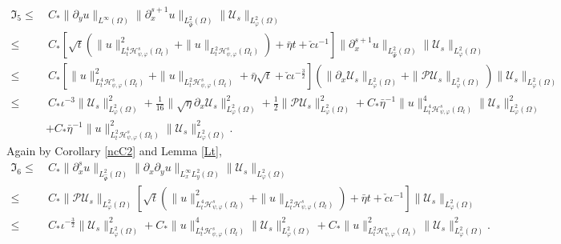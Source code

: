 \documentclass{amsart}
\numberwithin{equation}{section}
\begin{document}
\begin{align*}
\mathfrak{I}_{5}
\leq&~C_{*}\|\partial_{y}u\|_{L^{\infty}(\Omega)}\|\partial_{x}^{s+1}u\|_{L_{\hat{\Psi}}^{2}(\Omega)}\|\mathcal{U}_{s}\|_{L_{\varphi}^{2}(\Omega)}\\
\leq&~C_{*}\left[\sqrt{t}\left(\|u\|_{L_{t}^{4}\mathcal{H}_{\psi,\varphi}^{s}(\Omega_{t})}^{2}+\|u\|_{L_{t}^{2}\mathcal{H}_{\psi,\varphi}^{s}(\Omega_{t})}\right)
                 +\bar{\eta}t+\check{c}\iota^{-1}\right]
           \|\partial_{x}^{s+1}u\|_{L_{\hat{\Psi}}^{2}(\Omega)}
           \|\mathcal{U}_{s}\|_{L_{\varphi}^{2}(\Omega)}\\
\leq&~C_{*}\left[\|u\|_{L_{t}^{4}\mathcal{H}_{\psi,\varphi}^{s}(\Omega_{t})}^{2}+\|u\|_{L_{t}^{2}\mathcal{H}_{\psi,\varphi}^{s}(\Omega_{t})}
                 +\bar{\eta}\sqrt{t}+\check{c}\iota^{-\frac{3}{2}}\right]
          \left(\|\partial_{x}\mathcal{U}_{s}\|_{L_{\varphi}^{2}(\Omega)}+\|\mathcal{P}\mathcal{U}_{s}\|_{L_{\varphi}^{2}(\Omega)}\right)
           \|\mathcal{U}_{s}\|_{L_{\varphi}^{2}(\Omega)}\\
\leq&~C_{*}\iota^{-3}\|\mathcal{U}_{s}\|_{L_{\varphi}^{2}(\Omega)}^{2}
     +\frac{1}{16}\|\sqrt{\eta}\partial_{x}\mathcal{U}_{s}\|_{L_{\varphi}^{2}(\Omega)}^{2}
     +\frac{1}{2}\|\mathcal{P}\mathcal{U}_{s}\|_{L_{\varphi}^{2}(\Omega)}^{2}
     +C_{*}\bar{\eta}^{-1}\|u\|_{L_{t}^{4}\mathcal{H}_{\psi,\varphi}^{s}(\Omega_{t})}^{4}\|\mathcal{U}_{s}\|_{L_{\varphi}^{2}(\Omega)}^{2}\\
    &+C_{*}\bar{\eta}^{-1}\|u\|_{L_{t}^{2}\mathcal{H}_{\psi,\varphi}^{s}(\Omega_{t})}^{2}\|\mathcal{U}_{s}\|_{L_{\varphi}^{2}(\Omega)}^{2}.
\end{align*}
Again by Corollary \ref{ncC2} and Lemma \ref{Lt},
\begin{align*}
\mathfrak{I}_{6}
\leq&~C_{*}\|\partial_{x}^{s}u\|_{L_{\hat{\Psi}}^{2}(\Omega)}
           \|\partial_{x}\partial_{y}u\|_{L_{x}^{\infty}L_{y}^{2}(\Omega)}
           \|\mathcal{U}_{s}\|_{L_{\varphi}^{2}(\Omega)}\\
\leq&~C_{*}\|\mathcal{P}\mathcal{U}_{s}\|_{L_{\varphi}^{2}(\Omega)}
           \left[\sqrt{t}\left(\|u\|_{L_{t}^{4}\mathcal{H}_{\psi,\varphi}^{s}(\Omega_{t})}^{2}+\|u\|_{L_{t}^{2}\mathcal{H}_{\psi,\varphi}^{s}(\Omega_{t})}\right)
                 +\bar{\eta}t+\check{c}\iota^{-1}\right]
           \|\mathcal{U}_{s}\|_{L_{\varphi}^{2}(\Omega)}\\
\leq&~C_{*}\iota^{-\frac{3}{2}}\|\mathcal{U}_{s}\|_{L_{\varphi}^{2}(\Omega)}^{2}
     +C_{*}\|u\|_{L_{t}^{4}\mathcal{H}_{\psi,\varphi}^{s}(\Omega_{t})}^{4}\|\mathcal{U}_{s}\|_{L_{\varphi}^{2}(\Omega)}^{2}
     +C_{*}\|u\|_{L_{t}^{2}\mathcal{H}_{\psi,\varphi}^{s}(\Omega_{t})}^{2}\|\mathcal{U}_{s}\|_{L_{\varphi}^{2}(\Omega)}^{2}.
\end{align*}
\end{document}
